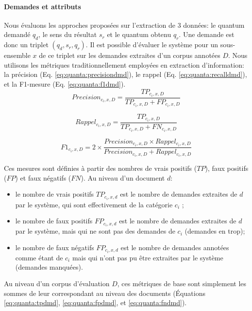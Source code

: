 \paragraph{Demandes et attributs}
 Nous évaluons les approches proposées sur l'extraction de 3 données: le quantum demandé $q_d$, le sens du résultat $s_r$ et le quantum obtenu $q_r$. Une demande est donc un triplet $(q_d, s_r, q_r)$. Il est possible d'évaluer le système pour un sous-ensemble $x$ de ce triplet sur les demandes extraites d'un corpus annotées $D$. Nous utilisons les métriques traditionnellement employées en extraction d'information: la précision (Eq. \ref{eq:quanta:precisiondmd}), le rappel (Eq. \ref{eq:quanta:recalldmd}), et la F1-mesure (Eq. \ref{eq:quanta:f1dmd}). 
 \begin{equation}
 Precision_{c_i,x,D} = \frac{TP_{c_i,x,D}}{TP_{c_i,x,D} + FP_{c_i,x,D}}  \label{eq:quanta:precisiondmd}
\end{equation}

\begin{equation}
Rappel_{c_i,x,D} = \frac{TP_{c_i,x,D}}{TP_{c_i,x,D} + FN_{c_i,x,D}} \label{eq:quanta:recalldmd}
\end{equation}

\begin{equation}
F1_{c_i,x,D} =2 \times \frac{Precision_{c_i,x,D} \times Rappel_{c_i,x,D}}{Precision_{c_i,x,D} + Rappel_{c_i,x,D}} \label{eq:quanta:f1dmd}
\end{equation}

Ces mesures sont définies à partir des nombres de vrais positifs ($TP$), faux positifs ($FP$) et faux négatifs ($FN$). Au niveau d'un document $d$:
\begin{itemize}
\item le nombre de vrais positifs $TP_{c_i, x, d}$ est le nombre de demandes extraites de $d$ par le système, qui sont effectivement de la catégorie $c_i$ ;
\item le nombre de faux positifs $FP_{c_i, x, d}$ est le nombre de demandes extraites de $d$ par le système, mais qui ne sont pas des demandes de $c_i$ (demandes en trop);
\item le nombre de faux négatifs $FP_{c_i, x, d}$ est le nombre de demandes annotées comme étant de $c_i$ mais qui n'ont pas pu être extraites par le système (demandes manquées).
\end{itemize}

Au niveau d'un corpus d'évaluation $D$, ces métriques de base sont simplement les sommes de leur correspondant au niveau des documents (Équations \ref{eq:quanta:tpdmd}, \ref{eq:quanta:fpdmd}, et \ref{eq:quanta:fndmd}).

